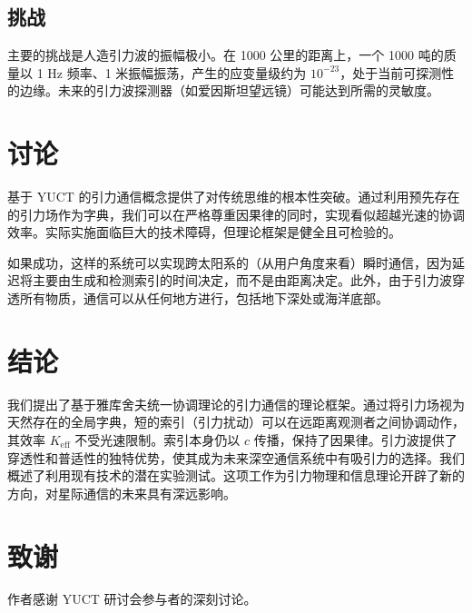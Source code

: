 \documentclass[12pt,a4paper]{article}
\newcommand{\Keff}{K_{\mathrm{eff}}}
\begin{document}
	\subsection{挑战}
	
	主要的挑战是人造引力波的振幅极小。在 1000 公里的距离上，一个 1000 吨的质量以 1 Hz 频率、1 米振幅振荡，产生的应变量级约为 \(10^{-23}\)，处于当前可探测性的边缘。未来的引力波探测器（如爱因斯坦望远镜）可能达到所需的灵敏度。
	
	\section{讨论}
	\label{sec:discussion}
	
	基于 YUCT 的引力通信概念提供了对传统思维的根本性突破。通过利用预先存在的引力场作为字典，我们可以在严格尊重因果律的同时，实现看似超越光速的协调效率。实际实施面临巨大的技术障碍，但理论框架是健全且可检验的。
	
	如果成功，这样的系统可以实现跨太阳系的（从用户角度来看）瞬时通信，因为延迟将主要由生成和检测索引的时间决定，而不是由距离决定。此外，由于引力波穿透所有物质，通信可以从任何地方进行，包括地下深处或海洋底部。
	
	\section{结论}
	\label{sec:conclusion}
	
	我们提出了基于雅库舍夫统一协调理论的引力通信的理论框架。通过将引力场视为天然存在的全局字典，短的索引（引力扰动）可以在远距离观测者之间协调动作，其效率 \(\Keff\) 不受光速限制。索引本身仍以 \(c\) 传播，保持了因果律。引力波提供了穿透性和普适性的独特优势，使其成为未来深空通信系统中有吸引力的选择。我们概述了利用现有技术的潜在实验测试。这项工作为引力物理和信息理论开辟了新的方向，对星际通信的未来具有深远影响。
	
	\section*{致谢}
	
	作者感谢 YUCT 研讨会参与者的深刻讨论。
	
\end{document}
